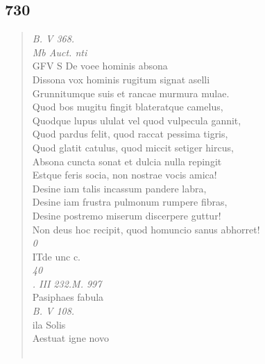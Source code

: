 \documentclass[11pt, a4paper]{report}
\begin{document}
            \subsection*{730}
      \begin{verse}
      \textit{B. V 368.} \\ \textit{Mb Auct. nti} \\ GFV S De voee hominis absona \\ Dissona vox hominis rugitum signat aselli \\ Grunnitumque suis et rancae murmura mulae. \\ Quod bos mugitu fingit blateratque camelus, \\ Quodque lupus ululat vel quod vulpecula gannit, \\ Quod pardus felit, quod raccat pessima tigris, \\ Quod glatit catulus, quod miccit setiger hircus, \\ Absona cuncta sonat et dulcia nulla repingit \\ Estque feris socia, non nostrae vocis amica! \\ Desine iam talis incassum pandere labra, \\ Desine iam frustra pulmonum rumpere fibras, \\ Desine postremo miserum discerpere guttur! \\ Non deus hoc recipit, quod homuncio sanus abhorret! \\ \textit{0} \\ ITde unc c. \\ \textit{40} \\ \textit{. III 232.M. 997} \\ Pasiphaes fabula \\ \textit{B. V 108.} \\ ila  \lbrack  Solis \rbrack  \\ Aestuat igne novo  \rbrack  \\ 
        ﻿\pagebreak 

\end{verse}
\end{document}
